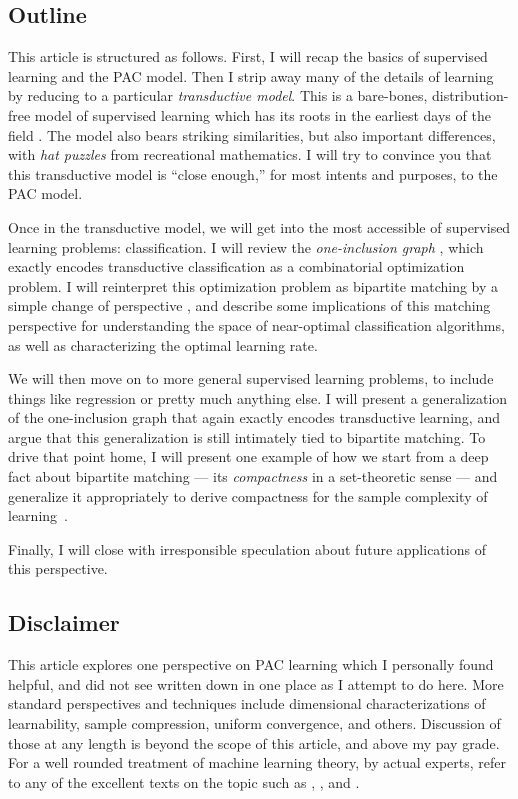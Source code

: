 \subsection*{Outline}
This article is structured as follows. First, I will recap the basics of supervised learning and the PAC model. Then I strip away many of the details of learning by reducing to a particular \emph{transductive model}. This is a bare-bones, distribution-free model of supervised learning which has its roots in the earliest days of the field \cite{vapnik_theory_1974,vapnik_estimation_1982,haussler_predicting_1994}. The model also bears striking similarities, but also important differences, with \emph{hat puzzles} from recreational mathematics.  I will try to convince you that this transductive model  is ``close enough,'' for most intents and purposes, to the PAC model.

Once in the transductive model, we will get into the most accessible of supervised learning problems: classification. I will review the \emph{one-inclusion graph} \cite{bondy_induced_1972,alon_partitioning_1987,haussler_predicting_1994}, which exactly encodes transductive classification as a combinatorial optimization problem. I will reinterpret this optimization problem as bipartite matching by a simple change of perspective \cite{asilis_regularization_2024}, and describe some implications of this matching perspective for understanding the space of near-optimal classification algorithms, as well as characterizing the optimal learning rate. 

We will then move on to more general supervised learning problems, to include things like regression or pretty much anything else. I will present a generalization of the one-inclusion graph that again exactly encodes transductive learning, and argue that this generalization is still intimately tied to bipartite matching. To drive that point home, I will present one example of how we start from a deep fact about bipartite matching --- its \emph{compactness} in a set-theoretic sense --- and generalize it appropriately to derive compactness for the sample complexity of learning~\cite{asilis_transductive_2024}.

Finally, I will close with irresponsible speculation about future applications of this perspective.

\subsection*{Disclaimer} This article explores one perspective on PAC learning which I personally found helpful,  and did not see written down in one place as I attempt to do here. More standard perspectives and techniques include dimensional characterizations of learnability, sample compression, uniform convergence, and others. Discussion of those at any length is beyond the scope of this article, and above my pay grade.  For a well rounded treatment of machine learning theory, by actual experts, refer to any of the excellent texts on the topic such as \citet{shalev-shwartz_understanding_2014}, \citet{mohri_foundations_2018}, and \citet{anthony_neural_1999}. 

